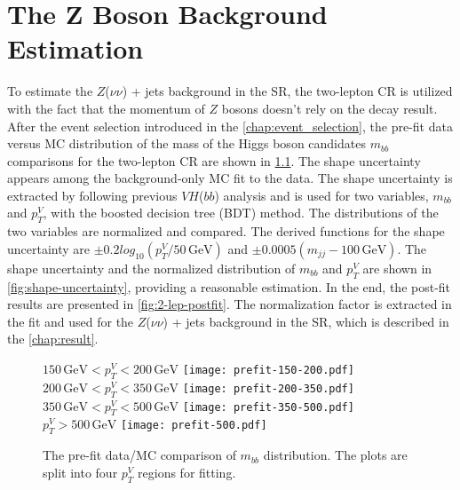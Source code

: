 \documentclass[class=NTHU_thesis, crop=false]{standalone}
\begin{document}
\chapter{The Z Boson Background Estimation}
\label{chap:Z_bkg_estimation}
To estimate the $Z$($\nu\nu$) + jets background in the SR, the two-lepton CR is utilized with the fact that the momentum of $Z$ bosons doesn't rely on the decay result. After the event selection introduced in the \autoref{chap:event_selection}, the pre-fit data versus MC distribution of the mass of the Higgs boson candidates $m_{bb}$ comparisons for the two-lepton CR are shown in \cref{fig:2-lep-prefit}. The shape uncertainty appears among the background-only MC fit to the data. The shape uncertainty is extracted by following previous $VH$($bb$) analysis\cite{Robson:2235887} and is used for two variables, $m_{bb}$ and $p^V_T$, with the boosted decision tree (BDT) method\cite{pmid28114007}. The distributions of the two variables are normalized and compared. The derived functions for the shape uncertainty are $\pm 0.2 log_{10} (p^V_T/50\, \mathrm{GeV})$ and $\pm 0.0005 (m_{jj} - 100\, \mathrm{GeV})$. The shape uncertainty and the normalized distribution of $m_{bb}$ and $p^V_T$ are shown in \cref{fig:shape-uncertainty}, providing a reasonable estimation. In the end, the post-fit results are presented in \cref{fig:2-lep-postfit}. The normalization factor is extracted in the fit and used for the $Z$($\nu\nu$) + jets background in the SR, which is described in the \autoref{chap:result}.

\begin{figure}[!hbt]
	\captionsetup[subfigure]{labelformat=empty}
	\centering
	\subcaptionbox
		{$150\, \mathrm{GeV} < p^V_T < 200\, \mathrm{GeV}$
		\label{fig:2-lep-prefit-fig1}}
		{\texttt{[image: prefit-150-200.pdf]}}
	~
	\subcaptionbox
		{$200\, \mathrm{GeV} < p^V_T < 350\, \mathrm{GeV}$
		\label{fig:2-lep-prefit-fig2}}
		{\texttt{[image: prefit-200-350.pdf]}}
	\vspace{\baselineskip}
	\subcaptionbox
		{$350\, \mathrm{GeV} < p^V_T < 500\, \mathrm{GeV}$
		\label{fig:2-lep-prefit-fig3}}
		{\texttt{[image: prefit-350-500.pdf]}}
	~
	\subcaptionbox
		{$p^V_T > 500\, \mathrm{GeV}$
		\label{fig:2-lep-prefit-fig4}}
		{\texttt{[image: prefit-500.pdf]}}
	\caption{The pre-fit data/MC comparison of $m_{bb}$ distribution. The plots are split into four $p^V_T$ regions for fitting.}
	\label{fig:2-lep-prefit}
\end{figure}
\end{document}
